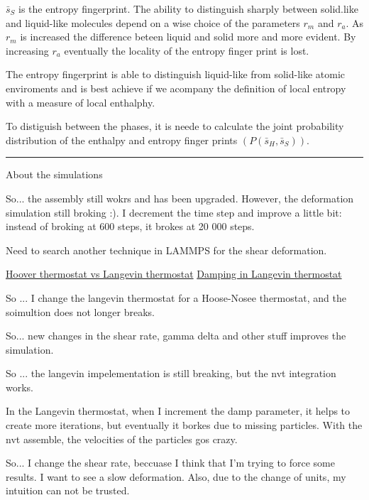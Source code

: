 \documentclass[a4paper, 11pt, oneside]{researchjournal} %
\begin{document}
$\bar{s}_S$ is the entropy fingerprint.
The ability to distinguish sharply between solid.like and liquid-like molecules depend on a wise choice of the parameters $r_m$ and $r_a$.
As $r_m$ is increased the difference beteen liquid and solid more and more evident.
By increasing $r_a$ eventually the locality of the entropy finger print is lost.

The entropy fingerprint is able to distinguish liquid-like from solid-like atomic enviroments and is best achieve if we acompany the definition of local entropy with a measure of local enthalphy.

To distiguish between the phases, it is neede to calculate the joint probability distribution of the enthalpy and entropy finger prints $(P(\bar{s}_H,\bar{s}_S))$.

\rule{\textwidth}{0.4pt}

About the simulations

So... the assembly still wokrs and has been upgraded. 
However, the deformation simulation still broking :).
I decrement the time step and improve a little bit: instead of broking at 600 steps, it brokes at 20 000 steps.

Need to search another technique in LAMMPS for the shear deformation.

\href{https://mattermodeling.stackexchange.com/questions/9374/langevin-vs-nos%C3%A9-hoover-thermostat}{Hoover thermostat vs Langevin thermostat}
\href{https://mattermodeling.stackexchange.com/questions/4245/selection-of-appropriate-langevin-damping-parameter-for-md-of-solid-metal?noredirect=1&lq=1}{Damping in Langevin thermostat}

So ... I change the langevin thermostat for a Hoose-Nosee thermostat, and the soimultion does not longer breaks.

So... new changes in the shear rate, gamma delta and other stuff improves the simulation.


So ... the langevin impelementation is still breaking, but the nvt integration works.

In the Langevin thermostat, when I increment the damp parameter, it helps to create more iterations, but eventually it borkes due to missing particles.
With the nvt assemble, the velocities of the particles gos crazy.

So... I change the shear rate, beccuase I think that I'm trying to force some results.
I want to see a slow deformation.
Also, due to the change of units, my intuition can not be trusted.
\end{document}
